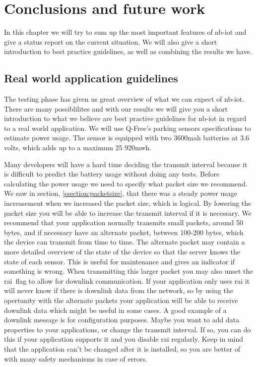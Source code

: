 \documentclass[USenglish]{ifimaster}  %
\begin{document}
\chapter{Conclusions and future work}                     %
In this chapter we will try to sum up the most important features of \acrshort{nb-iot} and give a status report on the current situation. We will also give a short introduction to best practice guidelines, as well as combining the results we have.

\section{Real world application guidelines} \label{section:guidelines}
The testing phase has given us great overview of what we can expect of \acrshort{nb-iot}. There are many possiblilites and with our results we will give you a short introduction to what we believe are best practive guidelines for \acrshort{nb-iot} in regard to a real world application. We will use Q-Free's parking sensors specifications to estimate power usage. The sensor is equipped with two 3600\acrshort{mah} batteries at 3.6 volts, which adds up to a maximum 25 920\acrshort{mwh}.

Many developers will have a hard time deciding the transmit interval because it is difficult to predict the battery usage without doing any tests. Before calculating the power usage we need to specify what packet size we recommend. We saw in section, \vref{ssection:packetsize}, that there was a steady power usage increasement when we increased the packet size, which is logical. By lowering the packet size you will be able to increase the transmit interval if it is necessary. We recommend that your application normally transmits small packets, around 50 bytes, and if necessary have an alternate packet, between 100-200 bytes, which the device can transmit from time to time. The alternate packet may contain a more detailed overview of the state of the device so that the server knows the state of each sensor. This is useful for maintenance and gives an indicator if something is wrong. When transmitting this larger packet you may also unset the \acrshort{rai} flag to allow for downlink communication. If your application only uses \acrshort{rai} it will never know if there is downlink data from the network, so by using the opertunity with the alternate packets your application will be able to receive downlink data which might be useful in some cases. A good example of a downlink message is for configuration purposes. Maybe you want to add data properties to your applications, or change the transmit interval. If so, you can do this if your application supports it and you disable \acrshort{rai} regularly. Keep in mind that the application can't be changed after it is installed, so you are better of with many safety mechanisms in case of errors.
\end{document}
